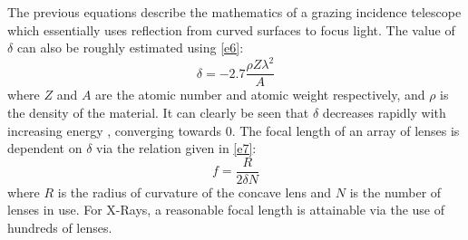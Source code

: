 The previous equations describe the mathematics of a grazing incidence telescope which essentially uses reflection from curved surfaces to focus light. The value of $\delta$ can also be roughly estimated using \ref{e6}:
\begin{equation}
\label{e6}
\delta = -2.7 \frac{\rho Z \lambda^2}{A}
\end{equation}
where $Z$ and $A$ are the atomic number and atomic weight respectively, and $\rho$ is the density of the material. It can clearly be seen that $\delta$ decreases rapidly with increasing energy , converging towards $0$. The focal length of an array of lenses is dependent on $\delta$ via the relation given in \ref{e7}:
\begin{equation}
\label{e7}
f=\frac{R}{2 \delta N}
\end{equation}
where $R$ is the radius of curvature of the concave lens and $N$ is the number of lenses in use. For X-Rays, a reasonable focal length is attainable via the use of hundreds of lenses.


